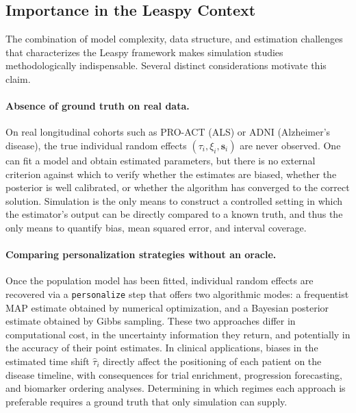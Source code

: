 \documentclass{rapportCS}
\begin{document}
\subsection{Importance in the Leaspy Context}\label{sec:importance-simulation-leaspy}

The combination of model complexity, data structure, and estimation challenges that characterizes the Leaspy framework makes simulation studies methodologically indispensable. Several distinct considerations motivate this claim.

\paragraph{Absence of ground truth on real data.}
On real longitudinal cohorts such as PRO-ACT (ALS) or ADNI (Alzheimer's disease), the true individual random effects $(\tau_i, \xi_i, \mathbf{s}_i)$ are never observed. One can fit a model and obtain estimated parameters, but there is no external criterion against which to verify whether the estimates are biased, whether the posterior is well calibrated, or whether the algorithm has converged to the correct solution. Simulation is the only means to construct a controlled setting in which the estimator's output can be directly compared to a known truth, and thus the only means to quantify bias, mean squared error, and interval coverage.

\paragraph{Comparing personalization strategies without an oracle.}
Once the population model has been fitted, individual random effects are recovered via a \texttt{personalize} step that offers two algorithmic modes: a frequentist MAP estimate obtained by numerical optimization, and a Bayesian posterior estimate obtained by Gibbs sampling. These two approaches differ in computational cost, in the uncertainty information they return, and potentially in the accuracy of their point estimates. In clinical applications, biases in the estimated time shift $\hat{\tau}_i$ directly affect the positioning of each patient on the disease timeline, with consequences for trial enrichment, progression forecasting, and biomarker ordering analyses. Determining in which regimes each approach is preferable requires a ground truth that only simulation can supply.
\end{document}
